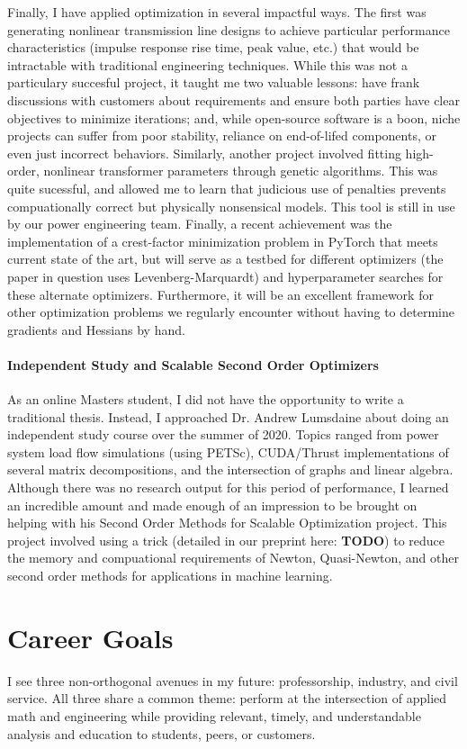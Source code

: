 \documentclass[letterpaper]{article}
\begin{document}
Finally, I have applied optimization in several impactful ways. The first was generating
nonlinear transmission line designs to achieve particular performance characteristics
(impulse response rise time, peak value, etc.) that would be intractable with traditional
engineering techniques. While this was not a particulary succesful project, it taught me two
valuable lessons: have frank discussions with customers about requirements and ensure
both parties have clear objectives to minimize iterations; and, while open-source
software is a boon, niche projects can suffer from poor stability, reliance on end-of-lifed
components, or even just incorrect behaviors. Similarly, another project involved
fitting high-order, nonlinear transformer parameters through genetic algorithms. This
was quite sucessful, and allowed me to learn that judicious use of penalties prevents
compuationally correct but physically nonsensical models. This tool is still in use
by our power engineering team. Finally, a recent achievement was the implementation of a
crest-factor minimization problem in PyTorch that meets current state of the art, but
will serve as a testbed for different optimizers (the paper in question uses
Levenberg-Marquardt) and hyperparameter searches for these alternate optimizers.
Furthermore, it will be an excellent framework for other optimization problems
we regularly encounter without having to determine gradients and Hessians by hand.

\paragraph{Independent Study and Scalable Second Order Optimizers}
As an online Masters student, I did not have the opportunity to write a traditional
thesis. Instead, I approached Dr. Andrew Lumsdaine about doing an independent
study course over the summer of 2020. Topics ranged from power system load flow
simulations (using PETSc), CUDA/Thrust implementations of several matrix
decompositions, and the intersection of graphs and linear algebra. Although there was
no research output for this period of performance, I learned an incredible amount
and made enough of an impression to be brought on helping with his Second Order Methods
for Scalable Optimization project. This project involved using a trick (detailed
in our preprint here: \textbf{TODO}) to reduce the memory and compuational requirements
of Newton, Quasi-Newton, and other second order methods for applications in machine
learning. 

\section*{Career Goals}
I see three non-orthogonal avenues in my future: professorship, industry, and civil service.
All three share a common theme: perform at the intersection of applied math and engineering
while providing relevant, timely, and understandable analysis and education to students,
peers, or customers.
\end{document}
